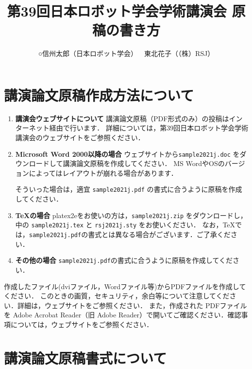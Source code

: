 \documentclass[a4paper]{jarticle}  %
\begin{document}
\title{第39回日本ロボット学会学術講演会 原稿の書き方}
\author{○信州太郎（日本ロボット学会）\ \ 東北花子（（株）RSJ）}

\setlength{\baselineskip}{4.4mm} %
\maketitle

\section{講演論文原稿作成方法について}
\begin{enumerate}
  \item {\bf 講演会ウェブサイトについて}
        講演論文原稿（PDF形式のみ）の投稿はインターネット経由で行います．
        詳細については，第39回日本ロボット学会学術講演会のウェブサイト\cite{website}をご参照ください．

  \item {\bf Microsoft Word 2000以降の場合}
        ウェブサイト\cite{website}から\verb|sample2021j.doc| をダウンロードして講演論文原稿を作成してください．
        MS WordやOSのバージョンによってはレイアウトが崩れる場合があります．

        そういった場合は，適宜 \verb|sample2021j.pdf| の書式に合うように原稿を作成してください．

  \item {\bf \TeX の場合}
        platex2eをお使いの方は，\verb|sample2021j.zip| をダウンロードし，
        中の \verb|sample2021j.tex| と \verb|rsj2021j.sty| をお使いください．
        なお，\TeX では，\verb|sample2021j.pdf|の書式とは異なる場合がございます．ご了承ください．

  \item {\bf その他の場合}
        \verb|sample2021j.pdf|の書式に合うように原稿を作成してください．
\end{enumerate}

作成したファイル(dviファイル，Wordファイル等)からPDFファイルを作成してください．
このときの画質，セキュリティ，余白等について注意してください．詳細は，ウェブサイト\cite{website}をご参照ください．
また，作成された PDFファイルを Adobe Acrobat Reader（旧 Adobe Reader）で開いてご確認ください．確認事項については，ウェブサイト\cite{website}をご参照ください．

\section{講演論文原稿書式について}
\end{document}

